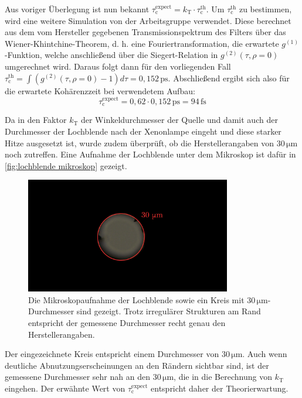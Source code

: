 Aus voriger Überlegung ist nun bekannt $\tau_{\mathrm{c}}^{\mathrm{expect}} = k_\mathrm{T}\cdot\tau_{\mathrm{c}}^{\mathrm{th}}$. 
Um $\tau_{\mathrm{c}}^{\mathrm{th}}$ zu bestimmen, wird eine weitere Simulation von der Arbeitsgruppe verwendet. 
Diese berechnet aus dem vom Hersteller gegebenen Transmissionspektrum des Filters über das Wiener-Khintchine-Theorem, d. h. eine Fouriertransformation, die erwartete $g^{(1)}$-Funktion, welche anschließend über die Siegert-Relation in $g^{(2)}(\tau, \rho=0)$ umgerechnet wird. 
Daraus folgt dann für den vorliegenden Fall $\tau_{\mathrm{c}}^{\mathrm{th}} = \int \left(g^{(2)}(\tau, \rho=0) -1\right) d\tau = 0{,}152\,\mathrm{ps}$. 
Abschließend ergibt sich also für die erwartete Kohärenzzeit bei verwendetem Aufbau:
\begin{equation}
    \tau_{\mathrm{c}}^{\mathrm{expect}} = 0{,}62 \cdot 0{,}152\,\mathrm{ps} = 94\,\mathrm{fs}
    \label{eq:tau_c_th}
\end{equation}

Da in den Faktor $k_\mathrm{T}$ der Winkeldurchmesser der Quelle und damit auch der Durchmesser der Lochblende nach der Xenonlampe eingeht und diese starker Hitze ausgesetzt ist, wurde zudem überprüft, ob die Herstellerangaben von 30\,$\mathrm{\mu m}$ noch zutreffen. 
Eine Aufnahme der Lochblende unter dem Mikroskop ist dafür in \autoref{fig:lochblende mikroskop} gezeigt. 
\begin{figure}[h]
    \centering
    \includegraphics[width=0.8\textwidth]{images/Aufbau/Lochblende_Mikroskop.png}
    \caption{Die Mikroskopaufnahme der Lochblende sowie ein Kreis mit $30\,\mathrm{\mu m}$-Durchmesser sind gezeigt. Trotz irregulärer Strukturen am Rand entspricht der gemessene Durchmesser recht genau den Herstellerangaben.}
    \label{fig:lochblende mikroskop}
\end{figure}
Der eingezeichnete Kreis entspricht einem Durchmesser von $30\,\mathrm{\mu m}$. 
Auch wenn deutliche Abnutzungserscheinungen an den Rändern sichtbar sind, ist der gemessene Durchmesser sehr nah an den $30\,\mathrm{\mu m}$, die in die Berechnung von $k_\mathrm{T}$ eingehen. 
Der erwähnte Wert von $\tau_{\mathrm{c}}^{\mathrm{expect}}$ entspricht daher der Theorierwartung. 
